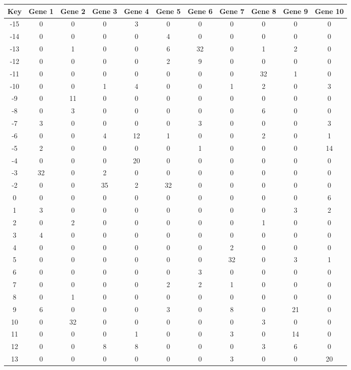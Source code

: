 \begin{tabular}{|c|c|c|c|c|c|c|c|c|c|c|}
\hline
Key & Gene 1 & Gene 2 & Gene 3 & Gene 4 & Gene 5 & Gene 6 & Gene 7 & Gene 8 & Gene 9 & Gene 10 \\
\hline
-15 & 0 & 0 & 0 & 3 & 0 & 0 & 0 & 0 & 0 & 0 \\
-14 & 0 & 0 & 0 & 0 & 4 & 0 & 0 & 0 & 0 & 0 \\
-13 & 0 & 1 & 0 & 0 & 6 & 32 & 0 & 1 & 2 & 0 \\
-12 & 0 & 0 & 0 & 0 & 2 & 9 & 0 & 0 & 0 & 0 \\
-11 & 0 & 0 & 0 & 0 & 0 & 0 & 0 & 32 & 1 & 0 \\
-10 & 0 & 0 & 1 & 4 & 0 & 0 & 1 & 2 & 0 & 3 \\
-9 & 0 & 11 & 0 & 0 & 0 & 0 & 0 & 0 & 0 & 0 \\
-8 & 0 & 3 & 0 & 0 & 0 & 0 & 0 & 6 & 0 & 0 \\
-7 & 3 & 0 & 0 & 0 & 0 & 3 & 0 & 0 & 0 & 3 \\
-6 & 0 & 0 & 4 & 12 & 1 & 0 & 0 & 2 & 0 & 1 \\
-5 & 2 & 0 & 0 & 0 & 0 & 1 & 0 & 0 & 0 & 14 \\
-4 & 0 & 0 & 0 & 20 & 0 & 0 & 0 & 0 & 0 & 0 \\
-3 & 32 & 0 & 2 & 0 & 0 & 0 & 0 & 0 & 0 & 0 \\
-2 & 0 & 0 & 35 & 2 & 32 & 0 & 0 & 0 & 0 & 0 \\
0 & 0 & 0 & 0 & 0 & 0 & 0 & 0 & 0 & 0 & 6 \\
1 & 3 & 0 & 0 & 0 & 0 & 0 & 0 & 0 & 3 & 2 \\
2 & 0 & 2 & 0 & 0 & 0 & 0 & 0 & 1 & 0 & 0 \\
3 & 4 & 0 & 0 & 0 & 0 & 0 & 0 & 0 & 0 & 0 \\
4 & 0 & 0 & 0 & 0 & 0 & 0 & 2 & 0 & 0 & 0 \\
5 & 0 & 0 & 0 & 0 & 0 & 0 & 32 & 0 & 3 & 1 \\
6 & 0 & 0 & 0 & 0 & 0 & 3 & 0 & 0 & 0 & 0 \\
7 & 0 & 0 & 0 & 0 & 2 & 2 & 1 & 0 & 0 & 0 \\
8 & 0 & 1 & 0 & 0 & 0 & 0 & 0 & 0 & 0 & 0 \\
9 & 6 & 0 & 0 & 0 & 3 & 0 & 8 & 0 & 21 & 0 \\
10 & 0 & 32 & 0 & 0 & 0 & 0 & 0 & 3 & 0 & 0 \\
11 & 0 & 0 & 0 & 1 & 0 & 0 & 3 & 0 & 14 & 0 \\
12 & 0 & 0 & 8 & 8 & 0 & 0 & 0 & 3 & 6 & 0 \\
13 & 0 & 0 & 0 & 0 & 0 & 0 & 3 & 0 & 0 & 20 \\
\hline
\end{tabular}